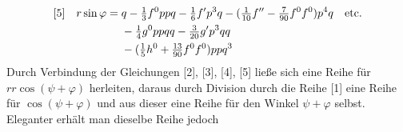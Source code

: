 \[
\begin{aligned}
\relax[5]\quad r\sin\varphi={}&q-\tfrac{1}{3}f^0ppq-\tfrac{1}{6}f'p^3q-(\tfrac{1}{10}f''-\tfrac{7}{90}f^0f^0)p^4q\quad\text{etc.}\\
&-\tfrac{1}{4}g^0ppqq-\tfrac{3}{20}g'p^3qq\\
&-(\tfrac{1}{5}h^0+\tfrac{13}{90}f^0f^0)ppq^3
\end{aligned}
\]
Durch Verbindung der Gleichungen [2], [3], [4], [5] ließe sich eine Reihe für \(rr\cos(\psi+\varphi)\) herleiten, daraus durch Division durch die Reihe [1] eine Reihe für \(\cos(\psi+\varphi)\) und aus dieser eine Reihe für den Winkel \(\psi+\varphi\) selbst. Eleganter erhält man dieselbe Reihe jedoch
